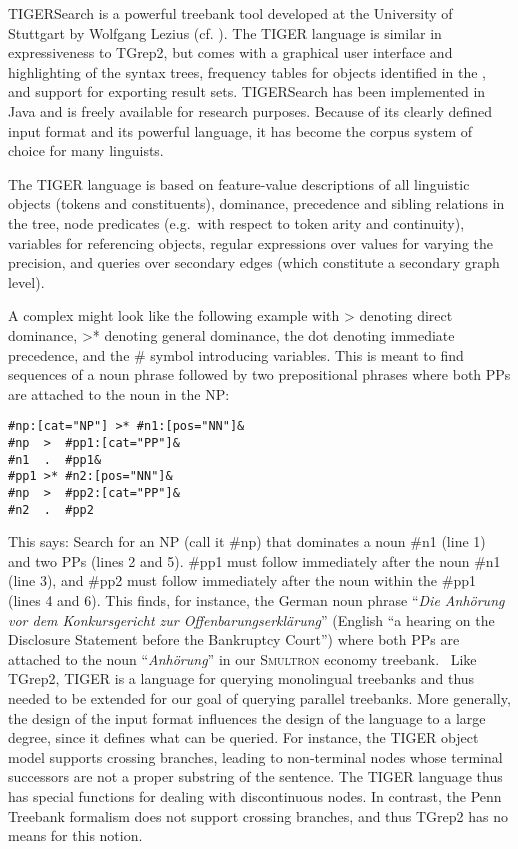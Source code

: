 \documentclass[output=paper]{LSP/langsci}
\begin{document}
TIGERSearch is a powerful treebank  tool developed at the University of Stuttgart by Wolfgang Lezius (cf. \citealt{König2002,Lezius2002a}). The TIGER  language is similar in expressiveness to TGrep2, but comes with a graphical user interface and highlighting of the syntax trees, frequency tables for objects identified in the , and support for exporting  result sets. TIGERSearch has been implemented in Java and is freely available for research purposes. Because of its clearly defined input format and its powerful  language, it has become the corpus  system of choice for many linguists. 

The TIGER  language is based on feature-value descriptions of all linguistic objects (tokens and constituents), dominance, precedence and sibling relations in the tree, node predicates (e.g.~with respect to token arity and continuity), variables for referencing objects, regular expressions over values for varying the  precision, and queries over secondary edges (which constitute a secondary graph level). 

A complex  might look like the following example with  {\textgreater} denoting direct dominance, {\textgreater}* denoting general dominance, the dot denoting immediate precedence, and the \# symbol introducing variables. This  is meant to find sequences of a noun phrase followed by two prepositional phrases where both PPs are attached to the noun in the NP:

\ea
 \begin{lstlisting}
#np:[cat="NP"] >* #n1:[pos="NN"]&
#np  >  #pp1:[cat="PP"]& 
#n1  .  #pp1& 
#pp1 >* #n2:[pos="NN"]& 
#np  >  #pp2:[cat="PP"]& 
#n2  .  #pp2 
 \end{lstlisting}
\z

This  says: Search for an NP (call it \#np) that dominates a noun \#n1 (line 1) and two PPs (lines 2 and 5). \#pp1 must follow immediately after the noun \#n1 (line 3), and \#pp2 must follow immediately after the noun within the \#pp1 (lines 4 and 6). This  finds, for instance, the German noun phrase ``\textit{Die Anhörung vor dem Konkursgericht zur Offenbarungserklärung}'' (English ``a hearing on the Disclosure Statement before the Bankruptcy Court'') where both PPs are attached to the noun ``\textit{Anhörung}'' in our S\textsc{multron} economy treebank. 
\
Like TGrep2, TIGER is a language for querying monolingual treebanks and thus needed to be extended for our goal of querying parallel treebanks. More generally, the design of the input format influences the design of the  language to a large degree, since it defines what can be queried. For instance, the TIGER object model supports crossing branches, leading to non-terminal nodes whose terminal successors are not a proper substring of the sentence. The TIGER  language thus has special functions for dealing with discontinuous nodes. In contrast, the Penn Treebank formalism does not support crossing branches, and thus TGrep2 has no means for this notion. 
\end{document}
